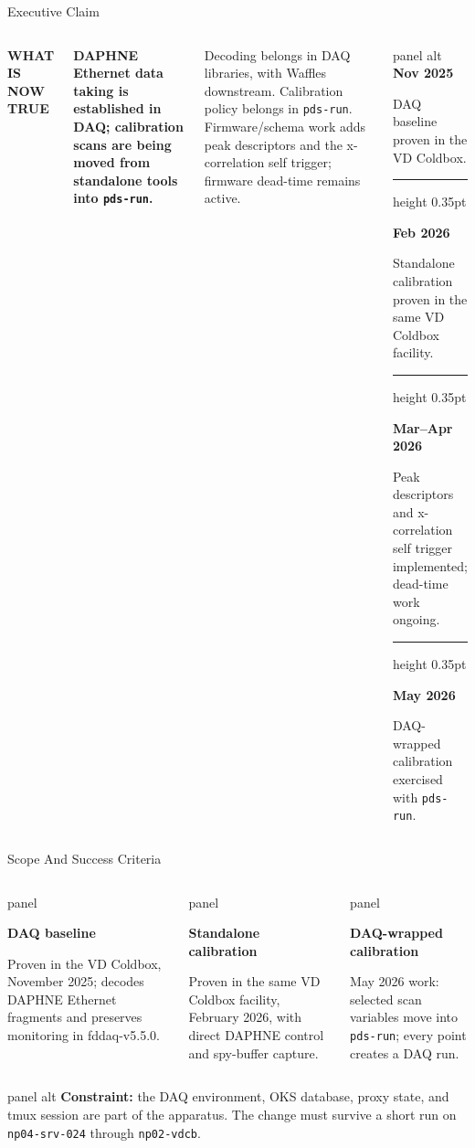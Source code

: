 \documentclass[aspectratio=169,10pt]{beamer}
\newcommand{\eyebrow}[1]{{\color{noircyan}\small\bfseries #1\par}}
\newcommand{\panelbox}[3][panel]{%
  \begin{beamercolorbox}[wd=\linewidth,sep=6pt,rounded=true]{#1}
    {\color{noircyan}\bfseries #2\par}
    \vspace{0.5mm}
    {\small #3\par}
  \end{beamercolorbox}
}
\newcommand{\blocksep}{%
  \vspace{0.7mm}%
  {\color{noirline}\hrule height 0.35pt}%
  \vspace{0.7mm}%
}
\begin{document}
\begin{frame}[t]{Executive Claim}
\begin{columns}[T,onlytextwidth]
\eyebrow{WHAT IS NOW TRUE}
{\color{white}\bfseries\fontsize{16}{19}\selectfont
DAPHNE Ethernet data taking is established in DAQ; calibration scans are being moved from standalone tools into \texttt{pds-run}. \par}

\vspace{1.5mm}
{\color{noirmuted}\small
Decoding belongs in DAQ libraries, with Waffles downstream. Calibration policy belongs in \texttt{pds-run}. Firmware/schema work adds peak descriptors and the x-correlation self trigger; firmware dead-time remains active. \par}

\begin{beamercolorbox}[wd=\linewidth,sep=6pt,rounded=true]{panel alt}
\scriptsize
{\color{noircyan}\bfseries Nov 2025}\par
DAQ baseline proven in the VD Coldbox.\par
\blocksep
{\color{noircyan}\bfseries Feb 2026}\par
Standalone calibration proven in the same VD Coldbox facility.\par
\blocksep
{\color{noircyan}\bfseries Mar--Apr 2026}\par
Peak descriptors and x-correlation self trigger implemented; dead-time work ongoing.\par
\blocksep
{\color{noircyan}\bfseries May 2026}\par
DAQ-wrapped calibration exercised with \texttt{pds-run}.\par
\end{beamercolorbox}
\end{columns}
\end{frame}

\begin{frame}[t]{Scope And Success Criteria}
\begin{columns}[T,onlytextwidth]
\panelbox{DAQ baseline}{%
Proven in the VD Coldbox, November 2025; decodes DAPHNE Ethernet fragments and preserves monitoring in fddaq-v5.5.0.}

\panelbox{Standalone calibration}{%
Proven in the same VD Coldbox facility, February 2026, with direct DAPHNE control and spy-buffer capture.}

\panelbox{DAQ-wrapped calibration}{%
May 2026 work: selected scan variables move into \texttt{pds-run}; every point creates a DAQ run.}
\end{columns}

\vspace{2mm}
\begin{beamercolorbox}[wd=\linewidth,sep=6pt,rounded=true]{panel alt}
\footnotesize
\textcolor{noircyan}{\textbf{Constraint:}} the DAQ environment, OKS database, proxy state, and tmux session are part of the apparatus. The change must survive a short run on \texttt{np04-srv-024} through \texttt{np02-vdcb}.
\end{beamercolorbox}
\end{frame}
\end{document}
